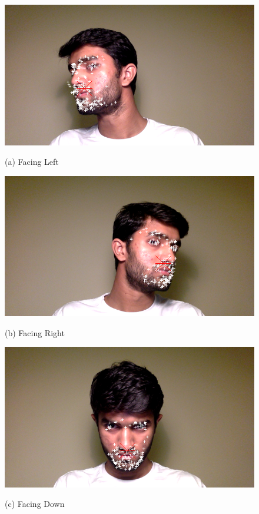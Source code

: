 \begin{figure}[htbp]
	\centering
	\begin{minipage}[t]{0.49\textwidth}\centering\includegraphics[width=\textwidth]{pics/leftTracking.png}\par(a) Facing Left  \end{minipage}
	\begin{minipage}[t]{0.49\textwidth}\centering\includegraphics[width=\textwidth]{pics/rightTracking.png}\par(b) Facing Right \end{minipage}
	\begin{minipage}[t]{0.49\textwidth}\centering\includegraphics[width=\linewidth]{pics/downTracking.png}\par(c) Facing Down \end{minipage}

\end{figure}
